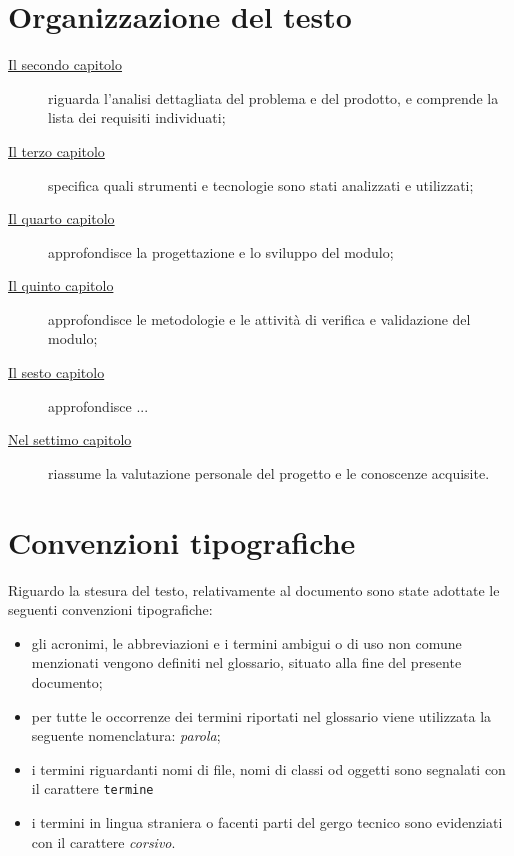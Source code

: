 \section{Organizzazione del testo}

\begin{description}
    \item[{\hyperref[cap:analisi-del-problema]{Il secondo capitolo}}] riguarda l'analisi dettagliata del problema e del prodotto, e comprende la lista dei requisiti individuati;
    
    \item[{\hyperref[cap:strumenti-e-tecnologie]{Il terzo capitolo}}] specifica quali strumenti e tecnologie sono stati analizzati e utilizzati;
    
    \item[{\hyperref[cap:progettazione-codifica]{Il quarto capitolo}}] approfondisce la progettazione e lo sviluppo del modulo;
    
    \item[{\hyperref[cap:verifica-validazione]{Il quinto capitolo}}] approfondisce le metodologie e le attività di verifica e validazione del modulo;
    
    \item[{\hyperref[cap:verifica-validazione]{Il sesto capitolo}}] approfondisce ...
    
    \item[{\hyperref[cap:conclusioni]{Nel settimo capitolo}}] riassume la valutazione personale del progetto e le conoscenze acquisite.
\end{description}

\section{Convenzioni tipografiche}

Riguardo la stesura del testo, relativamente al documento sono state adottate le seguenti convenzioni tipografiche:
\begin{itemize}
	\item gli acronimi, le abbreviazioni e i termini ambigui o di uso non comune menzionati vengono definiti nel glossario, situato alla fine del presente documento;
	\item per tutte le occorrenze dei termini riportati nel glossario viene utilizzata la seguente nomenclatura: \emph{parola}\glsfirstoccur;
	\item i termini riguardanti nomi di file, nomi di classi od oggetti sono segnalati con il carattere \texttt{termine}
	\item i termini in lingua straniera o facenti parti del gergo tecnico sono evidenziati con il carattere \emph{corsivo}.
\end{itemize}